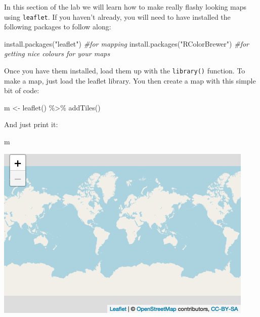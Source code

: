\documentclass[
]{book}
\makeatletter
\newenvironment{Shaded}{\begin{snugshade}}{\end{snugshade}}
\newcommand{\CommentTok}[1]{\textcolor[rgb]{0.37,0.37,0.37}{\textit{#1}}}
\newcommand{\FunctionTok}[1]{\textcolor[rgb]{0,0,0}{#1}}
\newcommand{\NormalTok}[1]{#1}
\newcommand{\OtherTok}[1]{\textcolor[rgb]{0.37,0.37,0.37}{#1}}
\newcommand{\SpecialCharTok}[1]{\textcolor[rgb]{0,0,0}{#1}}
\newcommand{\StringTok}[1]{\textcolor[rgb]{0.5,0.5,0.5}{#1}}
\newenvironment{kframe}{%
\medskip{}
\setlength{\fboxsep}{.8em}
 \def\at@end@of@kframe{}%
 \ifinner\ifhmode%
  \def\at@end@of@kframe{\end{minipage}}%
  \begin{minipage}{\columnwidth}%
 \fi\fi%
 \def\FrameCommand##1{\hskip\@totalleftmargin \hskip-\fboxsep
 \colorbox{shadecolor}{##1}\hskip-\fboxsep
     \hskip-\linewidth \hskip-\@totalleftmargin \hskip\columnwidth}%
 \MakeFramed {\advance\hsize-\width
   \@totalleftmargin\z@ \linewidth\hsize
   \@setminipage}}%
 {\par\unskip\endMakeFramed%
 \at@end@of@kframe}
\renewenvironment{Shaded}{\begin{kframe}}{\end{kframe}}
\makeatother
\begin{document}
In this section of the lab we will learn how to make really flashy looking maps using \texttt{leaflet}. If you haven't already, you will need to have installed the following packages to follow along:

\begin{Shaded}
\begin{Highlighting}[]
\FunctionTok{install.packages}\NormalTok{(}\StringTok{"leaflet"}\NormalTok{) }\CommentTok{\#for mapping}
\FunctionTok{install.packages}\NormalTok{(}\StringTok{"RColorBrewer"}\NormalTok{) }\CommentTok{\#for getting nice colours for your maps}
\end{Highlighting}
\end{Shaded}

Once you have them installed, load them up with the \texttt{library()} function. To make a map, just load the leaflet library. You then create a map with this simple bit of code:

\begin{Shaded}
\begin{Highlighting}[]
\NormalTok{m }\OtherTok{\textless{}{-}} \FunctionTok{leaflet}\NormalTok{() }\SpecialCharTok{\%\textgreater{}\%}
  \FunctionTok{addTiles}\NormalTok{()  }
\end{Highlighting}
\end{Shaded}

And just print it:

\begin{Shaded}
\begin{Highlighting}[]
\NormalTok{m  }
\end{Highlighting}
\end{Shaded}

\includegraphics{crime_mapping_files/figure-latex/unnamed-chunk-48-1.png}
\end{document}
